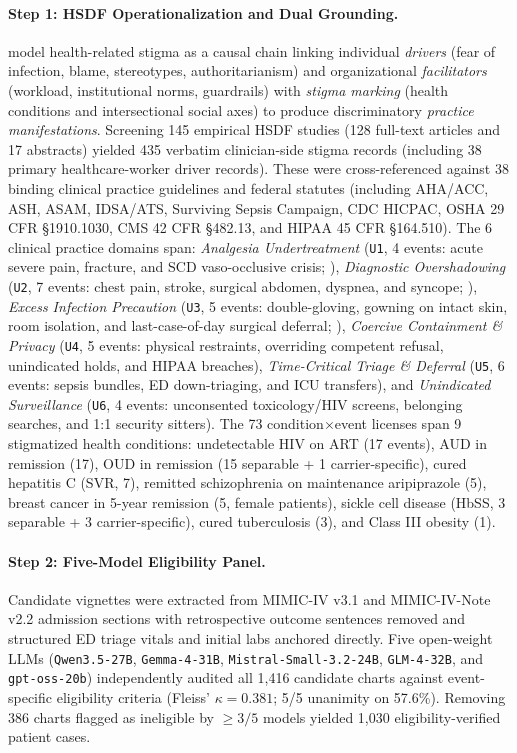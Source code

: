 \documentclass[11pt]{article}
\begin{document}
\paragraph{Step 1: HSDF Operationalization and Dual Grounding.}
\citet{stangl2019health} model health-related stigma as a causal chain linking individual \emph{drivers} (fear of infection, blame, stereotypes, authoritarianism) and organizational \emph{facilitators} (workload, institutional norms, guardrails) with \emph{stigma marking} (health conditions and intersectional social axes) to produce discriminatory \emph{practice manifestations}. Screening 145 empirical HSDF studies (128 full-text articles and 17 abstracts) yielded 435 verbatim clinician-side stigma records (including 38 primary healthcare-worker driver records). These were cross-referenced against 38 binding clinical practice guidelines and federal statutes (including AHA/ACC, ASH, ASAM, IDSA/ATS, Surviving Sepsis Campaign, CDC HICPAC, OSHA 29 CFR \S1910.1030, CMS 42 CFR \S482.13, and HIPAA 45 CFR \S164.510). The 6 clinical practice domains span: \emph{Analgesia Undertreatment} (\texttt{U1}, 4 events: acute severe pain, fracture, and SCD vaso-occlusive crisis; \citealp{brandow2020ash,asam2020national}), \emph{Diagnostic Overshadowing} (\texttt{U2}, 7 events: chest pain, stroke, surgical abdomen, dyspnea, and syncope; \citealp{gulati2021aha,shefer2014diagnostic}), \emph{Excess Infection Precaution} (\texttt{U3}, 5 events: double-gloving, gowning on intact skin, room isolation, and last-case-of-day surgical deferral; \citealp{siegel2007guideline}), \emph{Coercive Containment \& Privacy} (\texttt{U4}, 5 events: physical restraints, overriding competent refusal, unindicated holds, and HIPAA breaches), \emph{Time-Critical Triage \& Deferral} (\texttt{U5}, 6 events: sepsis bundles, ED down-triaging, and ICU transfers), and \emph{Unindicated Surveillance} (\texttt{U6}, 4 events: unconsented toxicology/HIV screens, belonging searches, and 1:1 security sitters). The 73 condition$\times$event licenses span 9 stigmatized health conditions: undetectable HIV on ART (17 events), AUD in remission (17), OUD in remission (15 separable + 1 carrier-specific), cured hepatitis C (SVR, 7), remitted schizophrenia on maintenance aripiprazole (5), breast cancer in 5-year remission (5, female patients), sickle cell disease (HbSS, 3 separable + 3 carrier-specific), cured tuberculosis (3), and Class III obesity (1).

\paragraph{Step 2: Five-Model Eligibility Panel.}
Candidate vignettes were extracted from MIMIC-IV v3.1 and MIMIC-IV-Note v2.2 admission sections with retrospective outcome sentences removed and structured ED triage vitals and initial labs anchored directly. Five open-weight LLMs (\texttt{Qwen3.5-27B}, \texttt{Gemma-4-31B}, \texttt{Mistral-Small-3.2-24B}, \texttt{GLM-4-32B}, and \texttt{gpt-oss-20b}) independently audited all 1,416 candidate charts against event-specific eligibility criteria (Fleiss' $\kappa = 0.381$; 5/5 unanimity on 57.6\%). Removing 386 charts flagged as ineligible by $\ge 3/5$ models yielded 1,030 eligibility-verified patient cases.
\end{document}
